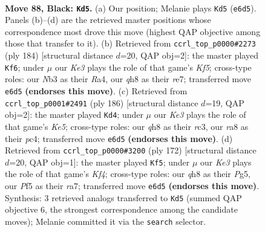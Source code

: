 \documentclass[11pt]{article}
\begin{document}
\clearpage

\begin{figure}[p]\centering
\begin{subfigure}{0.46\textwidth}\centering
\resizebox{\linewidth}{!}{%
\newchessgame
\chessboard[
  setfen={R6Q/8/4k1p1/5p2/5P2/1n6/6K1/8 b - - 0 88},
  showmover=false,
  pgfstyle=straightmove, color=movearrow, markmove={e6-d5}
]}
\caption{}
\end{subfigure}\hfill
\begin{subfigure}{0.46\textwidth}\centering
\resizebox{\linewidth}{!}{%
\newchessgame
\chessboard[
  setfen={7k/4r3/7p/5K1P/R5P1/8/8/8 w - - 75 93},
  showmover=false,
  pgfstyle=straightmove, color=movearrow, markmove={f5-f6}
]}
\caption{}
\end{subfigure}
\\[4pt]
\begin{subfigure}{0.46\textwidth}\centering
\resizebox{\linewidth}{!}{%
\newchessgame
\chessboard[
  setfen={8/5k2/3P4/p1N1K3/P1p5/2r5/8/8 w - - 0 94},
  showmover=false,
  pgfstyle=straightmove, color=movearrow, markmove={e5-d4}
]}
\caption{}
\end{subfigure}\hfill
\begin{subfigure}{0.46\textwidth}\centering
\resizebox{\linewidth}{!}{%
\newchessgame
\chessboard[
  setfen={8/r5k1/8/6Pp/2R2K1P/8/8/8 w - - 1 87},
  showmover=false,
  pgfstyle=straightmove, color=movearrow, markmove={f4-f5}
]}
\caption{}
\end{subfigure}
\caption{\textbf{Move 88, Black: \texttt{Kd5}.} (a) Our position; Melanie plays \texttt{Kd5} (\texttt{e6d5}). Panels (b)--(d) are the retrieved master positions whose correspondence most drove this move (highest QAP objective among those that transfer to it). (b) Retrieved from \texttt{ccrl\_top\_p0000\#2273} (ply 184) [structural distance $d$=20, QAP obj=2]: the master played \texttt{Kf6}; under $\mu$ our \emph{Ke3} plays the role of that game's \emph{Kf5}; cross-type roles: our \emph{N}b3 as their \emph{R}a4, our \emph{q}h8 as their \emph{r}e7; transferred move \texttt{e6d5} \textbf{(endorses this move)}. (c) Retrieved from \texttt{ccrl\_top\_p0001\#2491} (ply 186) [structural distance $d$=19, QAP obj=2]: the master played \texttt{Kd4}; under $\mu$ our \emph{Ke3} plays the role of that game's \emph{Ke5}; cross-type roles: our \emph{q}h8 as their \emph{r}c3, our \emph{r}a8 as their \emph{p}c4; transferred move \texttt{e6d5} \textbf{(endorses this move)}. (d) Retrieved from \texttt{ccrl\_top\_p0000\#3200} (ply 172) [structural distance $d$=20, QAP obj=1]: the master played \texttt{Kf5}; under $\mu$ our \emph{Ke3} plays the role of that game's \emph{Kf4}; cross-type roles: our \emph{q}h8 as their \emph{P}g5, our \emph{P}f5 as their \emph{r}a7; transferred move \texttt{e6d5} \textbf{(endorses this move)}. Synthesis: 3 retrieved analogs transferred to \texttt{Kd5} (summed QAP objective 6, the strongest correspondence among the candidate moves); Melanie committed it via the \texttt{search} selector.}
\label{fig:thought-m175}
\end{figure}
\end{document}
